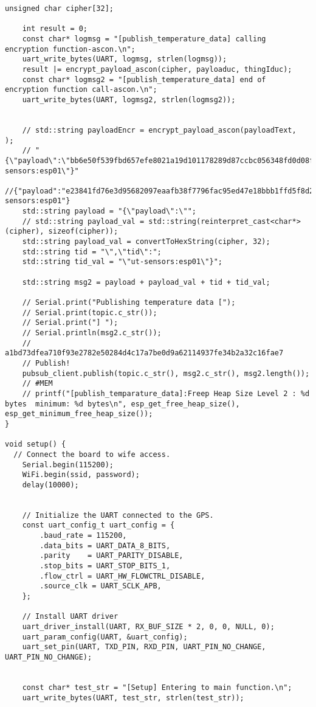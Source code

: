 \begin{lstlisting}[style=CStyle, caption={Main Source C File of The Proposed Implementation}, label={list:mainc-ascon}]
    unsigned char cipher[32];

    int result = 0;
    const char* logmsg = "[publish_temperature_data] calling encryption function-ascon.\n";
    uart_write_bytes(UART, logmsg, strlen(logmsg));
    result |= encrypt_payload_ascon(cipher, payloaduc, thingIduc);
    const char* logmsg2 = "[publish_temperature_data] end of encryption function call-ascon.\n";
    uart_write_bytes(UART, logmsg2, strlen(logmsg2));
    

    // std::string payloadEncr = encrypt_payload_ascon(payloadText,  );
    // "{\"payload\":\"bb6e50f539fbd657efe8021a19d101178289d87ccbc056348fd0d08fbc150528\",\"tid\":\"ut-sensors:esp01\"}"
    //{"payload":"e23841fd76e3d95682097eaafb38f7796fac95ed47e18bbb1ffd5f8d223e7a49","tid":"ut-sensors:esp01"}
    std::string payload = "{\"payload\":\"";
    // std::string payload_val = std::string(reinterpret_cast<char*>(cipher), sizeof(cipher));
    std::string payload_val = convertToHexString(cipher, 32);
    std::string tid = "\",\"tid\":";
    std::string tid_val = "\"ut-sensors:esp01\"}";

    std::string msg2 = payload + payload_val + tid + tid_val;

    // Serial.print("Publishing temperature data [");
    // Serial.print(topic.c_str());
    // Serial.print("] ");
    // Serial.println(msg2.c_str());
    // a1bd73dfea710f93e2782e50284d4c17a7be0d9a62114937fe34b2a32c16fae7
    // Publish!
    pubsub_client.publish(topic.c_str(), msg2.c_str(), msg2.length());
    // #MEM
    // printf("[publish_temparature_data]:Freep Heap Size Level 2 : %d bytes  minimum: %d bytes\n", esp_get_free_heap_size(), esp_get_minimum_free_heap_size()); 
}

void setup() {
  // Connect the board to wife access.
    Serial.begin(115200);
    WiFi.begin(ssid, password);
    delay(10000);


    // Initialize the UART connected to the GPS.
    const uart_config_t uart_config = {
        .baud_rate = 115200,
        .data_bits = UART_DATA_8_BITS,
        .parity    = UART_PARITY_DISABLE,
        .stop_bits = UART_STOP_BITS_1,
        .flow_ctrl = UART_HW_FLOWCTRL_DISABLE,
        .source_clk = UART_SCLK_APB,
    };

    // Install UART driver
    uart_driver_install(UART, RX_BUF_SIZE * 2, 0, 0, NULL, 0);
    uart_param_config(UART, &uart_config);
    uart_set_pin(UART, TXD_PIN, RXD_PIN, UART_PIN_NO_CHANGE, UART_PIN_NO_CHANGE);


    const char* test_str = "[Setup] Entering to main function.\n";
    uart_write_bytes(UART, test_str, strlen(test_str));


\end{lstlisting}
